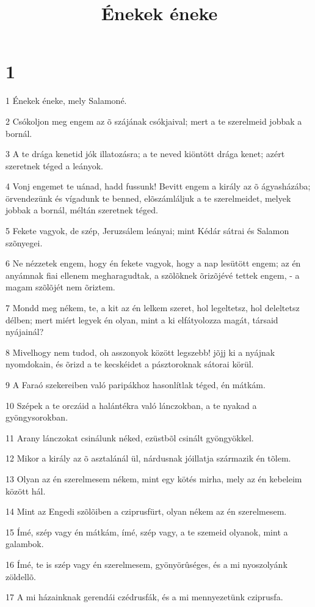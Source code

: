 

\title{Énekek éneke}


\chapter{1}

\par 1 Énekek éneke, mely Salamoné.
\par 2 Csókoljon meg engem az õ szájának csókjaival; mert a te szerelmeid jobbak a bornál.
\par 3 A te drága kenetid jók illatozásra; a te neved kiöntött drága kenet; azért szeretnek téged a leányok.
\par 4 Vonj engemet te uánad, hadd fussunk! Bevitt engem a király az õ ágyasházába; örvendezünk  és vígadunk te benned, elõszámláljuk a te szerelmeidet, melyek jobbak a bornál, méltán szeretnek téged.
\par 5 Fekete vagyok, de szép, Jeruzsálem leányai; mint Kédár sátrai és Salamon szõnyegei.
\par 6 Ne nézzetek engem, hogy én fekete vagyok, hogy a nap lesütött engem; az én anyámnak fiai ellenem megharagudtak, a szõlõknek õrizõjévé tettek engem, - a magam szõlõjét nem õriztem.
\par 7 Mondd meg nékem, te, a kit az én lelkem szeret, hol legeltetsz, hol deleltetsz délben; mert miért legyek én olyan, mint a ki elfátyolozza magát, társaid nyájainál?
\par 8 Mivelhogy nem tudod, oh asszonyok között legszebb! jõjj ki a nyájnak nyomdokain, és õrizd a te kecskéidet a pásztoroknak sátorai körül.
\par 9 A Faraó szekereiben való paripákhoz hasonlítlak téged, én mátkám.
\par 10 Szépek a te orczáid a halántékra való lánczokban, a te nyakad a gyöngysorokban.
\par 11 Arany lánczokat csinálunk néked, ezüstbõl csinált gyöngyökkel.
\par 12 Mikor a király az õ asztalánál ül, nárdusnak jóillatja származik én tõlem.
\par 13 Olyan az én szerelmesem nékem, mint egy kötés mirha, mely az én kebeleim között hál.
\par 14 Mint az Engedi szõlõiben a cziprusfürt, olyan nékem az én szerelmesem.
\par 15 Ímé, szép vagy én mátkám, ímé, szép vagy, a te szemeid olyanok, mint a galambok.
\par 16 Ímé, te is szép vagy én szerelmesem, gyönyörûséges, és a mi nyoszolyánk zöldellõ.
\par 17 A mi házainknak gerendái czédrusfák, és a mi mennyezetünk cziprusfa.

